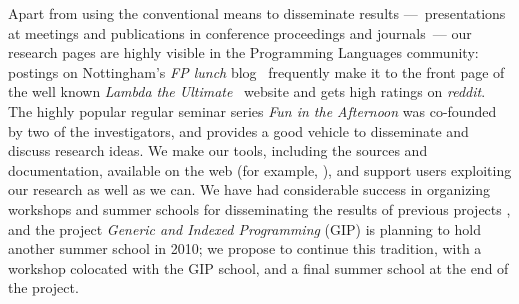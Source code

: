 \documentclass[a4paper]{article}
\begin{document}
{
Apart from using the conventional means to disseminate results
---~presentations at meetings and publications in conference
proceedings and journals~--- our research pages are highly visible in
the Programming Languages community: postings on Nottingham's
\textit{FP lunch} blog~\cite{fplunchweb} frequently make it to the
front page of the well known \textit{Lambda the
  Ultimate}~\cite{lambda-the-ultimate} website and gets high ratings
on \emph{reddit}. The highly popular regular seminar series \emph{Fun
  in the Afternoon} was co-founded by two of the investigators, and
provides a good vehicle to disseminate and discuss research ideas. We
make our tools, including the sources and documentation, available on
the web (for example, \cite{epigram2}), and support users exploiting
our research as well as we can.  We have had considerable success in
organizing workshops and summer schools for disseminating the results
of previous projects
\cite{Backhouse*2002:Algebraic,Backhouse&Gibbons2003:Summer,Backhouse*2007:Datatype},
and the project \emph{Generic and Indexed Programming} (GIP) is planning to
hold another summer school in 2010; we propose to continue this
tradition, with a workshop colocated
with the GIP school, and a final summer school at the end of the project.
\par}

{\small 
 \let\LIST\list \def\list#1#2{\LIST{#1}{#2 \squash}}
 
}
\end{document}
